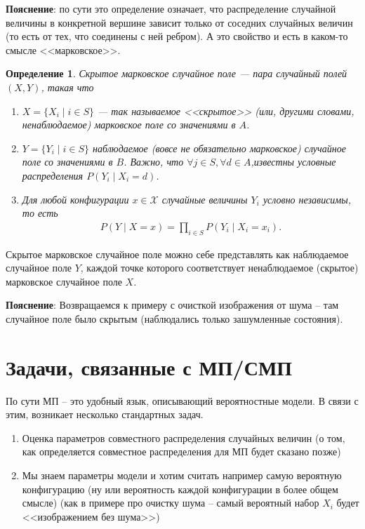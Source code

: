 \documentclass[12pt]{article}
\newtheorem{dfn}{Определение}
\begin{document}
\textbf{Пояснение}: по сути это определение означает, что распределение случайной величины в конкретной вершине зависит только от соседних случайных величин (то есть от тех, что соединены с ней ребром). А это свойство и есть в каком-то смысле <<марковское>>.


\begin{dfn}
Скрытое марковское случайное поле --- пара случайный полей $(X, Y)$, такая что 
\begin{enumerate}
\item $X = \{ X_i \mid i \in S \}$ --- так называемое <<скрытое>> (или, другими словами, ненаблюдаемое) марковское поле со значениями в $A$.
\item  $Y = \{ Y_i \mid i \in S \}$  наблюдаемое (вовсе не обязательно марковское) случайное поле со значениями в $B$. Важно, что $\forall j \in S, \forall d \in A$,известны условные распределения $P(Y_i \mid X_i = d)$.
\item Для любой конфигурации $x\in \mathcal{X}$ случайные величины $Y_i$ условно независимы, то есть
\begin{gather*}
P(Y\mid X = x) = \prod\limits_{i \in S} P(Y_i\mid X_i = x_i).
\end{gather*}
\end{enumerate}
\end{dfn}
Скрытое марковское случайное поле можно себе представлять как
наблюдаемое случайное поле $Y$, каждой точке которого соответствует ненаблюдаемое (скрытое) марковское случайное поле $X$. 

\textbf{Пояснение}: Возвращаемся к примеру с очисткой изображения от шума -- там случайное поле было скрытым (наблюдались только зашумленные состояния).


\section{Задачи, связанные с МП/СМП}
По сути МП -- это удобный язык, описывающий вероятностные модели. В связи с этим, возникает несколько стандартных задач. 
\begin{enumerate}
\item Оценка параметров совместного распределения случайных величин (о том, как определяется совместное распределения для МП будет сказано позже)
\item Мы знаем параметры модели и хотим считать например самую вероятную конфигурацию (ну или вероятность каждой конфигурации в более общем смысле) (как в примере про очистку шума -- самый вероятный набор $X_i$ будет <<изображением без шума>>)
\end{enumerate}
\end{document}
